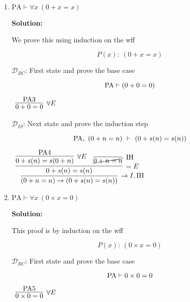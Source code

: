 \documentclass[11pt]{report}
\begin{document}
\begin{enumerate}
	\begin{enumerate}
		\item $\text{PA} \vdash \forall x \ (0 + x = x)$
		
		{\bf Solution:} 

		We prove this using induction on the wff 

		$$ P(x) : \ (0 + x = x)$$

		$\mathcal{D}_{BC}$: First state and prove the base case 

		$$ \text{PA} \vdash (0 + 0 = 0)$$

		\begin{mdframed}
			\begin{center}
				$\begin{array}{c}
					\infer[\forall E]{0 + 0 = 0}
						{\PA 3}
				\end{array}$
			\end{center}
		\end{mdframed}

		$\mathcal{D}_{IS}$: Next state and prove the induction step

		$$ \text{PA}, \ (0 + n = n) \ \vdash \ (0 + s(n) = s(n)) $$

		\begin{mdframed}
			\begin{center}
				$\begin{array}{c}
					\infer[\to I, \IH]{(0 + n = n) \to (0 + s(n) = s(n))}
						{\infer[=E]{0 + s(n) = s(n)}
							{\infer[\forall E]{0 + s(n) = s(0+n)}{\PA 4}
							&
							\infer[\IH]{\cancel{0+n=n}}{}}}
				\end{array}$
			\end{center}
		\end{mdframed}
		
		\newpage
		\item $\text{PA} \vdash \forall x \ (0 \times x = 0)$


		{\bf Solution:} 

		This proof is by induction on the wff 

		$$ P(x) : \ (0 \times x = 0)$$

		$\mathcal{D}_{BC}$: First state and prove the base case 

		$$ \text{PA} \vdash 0 \times 0 = 0$$

		\begin{mdframed}
			\begin{center}
				$\begin{array}{c}
					\infer[\forall E]{0 \times 0 = 0}
						{\PA 5}
				\end{array}$
			\end{center}
		\end{mdframed}


\end{enumerate}
\end{enumerate}
\end{document}
